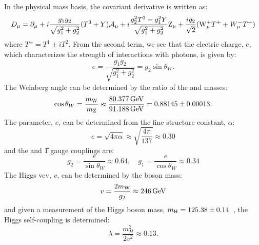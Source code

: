 In the physical mass basis, the covariant derivative is written as:
\begin{equation}
  D_\mu = \partial_\mu + i \frac{g_1 g_2}{\sqrt{g_1^2 + g_2^2}}(T^3 + Y)\mathcal{A}_\mu + i \frac{g_2^2 T^3 - g_1^2 Y}{\sqrt{g_1^2 + g_2^2}} \mathrm{Z}_\mu + \frac{ig_2}{\sqrt{2}} (\mathrm{W}_\mu^+ T^+ + W_\mu^- T^-)
\end{equation}
where $T^\pm = T^1 \pm iT^2$. From the second term, we see that the electric charge, $e$, which characterizes the strength of interactions with photons, is given by:
\begin{equation}
  e = \frac{g_1 g_2}{\sqrt{g_1^2 + g_2^2}} = g_2 \sin{\theta_W} .
\end{equation}
The Weinberg angle can be determined by the ratio of the \PW and \PZ masses:
\begin{equation}
  \cos{\theta_W} = \frac{m_\mathrm{W}}{m_\mathrm{Z}} \approx \frac{80.377\,\text{Ge\hspace{-.08em}V}}{91.188\,\text{Ge\hspace{-.08em}V}} = 0.88145 \pm 0.00013 .
\end{equation}
The parameter, $e$, can be determined from the fine structure constant, $\alpha$:
\begin{equation}
  e = \sqrt{4\pi \alpha} \approx \sqrt{\frac{4\pi}{137}} \approx 0.30
\end{equation}
and the  and \U{1} gauge couplings are:
\begin{equation}
  g_2 = \frac{e}{\sin{\theta_W}} \approx 0.64,\quad g_1 = \frac{e}{\cos{\theta_W}} \approx 0.34
\end{equation}
The Higgs vev, $v$, can be determined by the \PW boson mass:
\begin{equation}
  v = \frac{2m_\mathrm{W}}{g_2} \approx 246\,\text{Ge\hspace{-.08em}V}
\end{equation}
and given a measurement of the Higgs boson mass, ${m_\mathrm{H} = 125.38 \pm 0.14}$~\cite{CMS:2020xrn}, the Higgs self-coupling is determined:
\begin{equation}
  \lambda = \frac{m_H^2}{2v^2} \approx 0.13 .
  \label{eq:higgs_self_coupling}
\end{equation}

